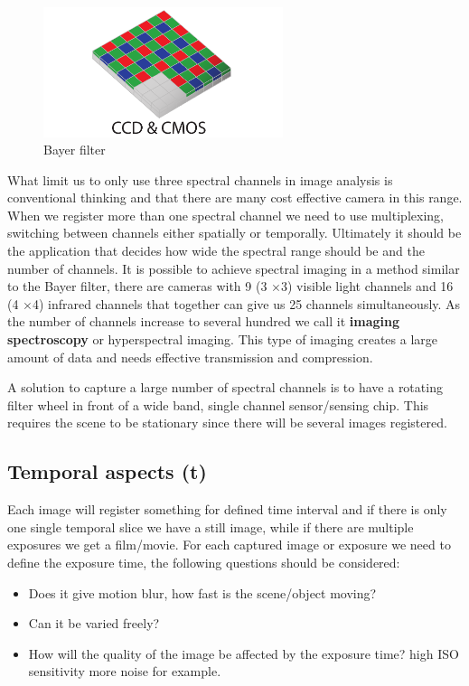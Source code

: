 \begin{figure}[ht!]
\centering
\includegraphics[width=70mm]{figures/CCDandCMOS.pdf}
\caption{Bayer filter}
\label{fig:example}
\end{figure}

What limit us to only use three spectral channels in image analysis is conventional thinking and that there are many cost effective camera in this range. When we register more than one spectral channel we need to use multiplexing, switching between channels either spatially or temporally. Ultimately it should be the application that decides how wide the spectral range should be and the number of channels. It is possible to achieve spectral imaging in a method similar to the Bayer filter, there are cameras with 9 (3 $\times$3) visible light channels and 16 (4 $\times$4) infrared channels that together can give us 25 channels simultaneously. As the number of channels increase to several hundred we call it \textbf{imaging spectroscopy} or hyperspectral imaging. This type of imaging creates a large amount of data and needs effective transmission and compression. 

A solution to capture a large number of spectral channels is to have a rotating filter wheel in front of a wide band, single channel sensor/sensing chip. This requires the scene to be stationary since there will be several images registered.

\subsection*{Temporal aspects (\textbf{t})}
Each image will register something for defined time interval and if there is only one single temporal slice we have a still image, while if there are multiple exposures we get a film/movie. For each captured image or exposure we need to define the exposure time, the following questions should be considered:

\begin{itemize}
	\item Does it give motion blur, how fast is the scene/object moving?
	\item Can it be varied freely?
	\item How will the quality of the image be affected by the exposure time? high ISO sensitivity more noise for example. 
\end{itemize}

